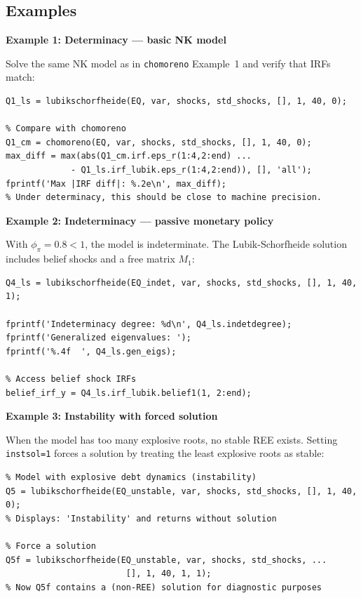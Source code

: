 \documentclass{article}
\begin{document}
\subsection{Examples}

\noindent\textbf{Example 1: Determinacy --- basic NK model}

\medskip
\noindent Solve the same NK model as in \texttt{chomoreno} Example~1 and verify that IRFs match:
\begin{verbatim}
Q1_ls = lubikschorfheide(EQ, var, shocks, std_shocks, [], 1, 40, 0);

% Compare with chomoreno
Q1_cm = chomoreno(EQ, var, shocks, std_shocks, [], 1, 40, 0);
max_diff = max(abs(Q1_cm.irf.eps_r(1:4,2:end) ...
             - Q1_ls.irf_lubik.eps_r(1:4,2:end)), [], 'all');
fprintf('Max |IRF diff|: %.2e\n', max_diff);
% Under determinacy, this should be close to machine precision.
\end{verbatim}

\vspace{1em}
\noindent\textbf{Example 2: Indeterminacy --- passive monetary policy}

\medskip
\noindent With $\phi_\pi = 0.8 < 1$, the model is indeterminate. The Lubik-Schorfheide solution includes belief shocks and a free matrix $M_1$:
\begin{verbatim}
Q4_ls = lubikschorfheide(EQ_indet, var, shocks, std_shocks, [], 1, 40, 1);

fprintf('Indeterminacy degree: %d\n', Q4_ls.indetdegree);
fprintf('Generalized eigenvalues: ');
fprintf('%.4f  ', Q4_ls.gen_eigs);

% Access belief shock IRFs
belief_irf_y = Q4_ls.irf_lubik.belief1(1, 2:end);
\end{verbatim}

\vspace{1em}
\noindent\textbf{Example 3: Instability with forced solution}

\medskip
\noindent When the model has too many explosive roots, no stable REE exists. Setting \texttt{instsol=1} forces a solution by treating the least explosive roots as stable:
\begin{verbatim}
% Model with explosive debt dynamics (instability)
Q5 = lubikschorfheide(EQ_unstable, var, shocks, std_shocks, [], 1, 40, 0);
% Displays: 'Instability' and returns without solution

% Force a solution
Q5f = lubikschorfheide(EQ_unstable, var, shocks, std_shocks, ...
                        [], 1, 40, 1, 1);
% Now Q5f contains a (non-REE) solution for diagnostic purposes
\end{verbatim}
\end{document}
